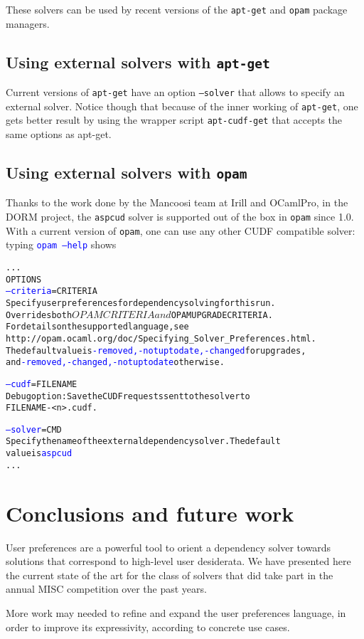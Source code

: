 \documentclass{article}
\begin{document}
These solvers can be used by recent versions of the \texttt{apt-get} and \texttt{opam} package managers.

\subsection{Using external solvers with \texttt{apt-get}}

Current versions of \texttt{apt-get} have an option \texttt{--solver} that allows to specify an external
solver. Notice though that because of the inner working of \texttt{apt-get}, one gets better result
by using the wrapper script \texttt{apt-cudf-get} that accepts the same options as apt-get.

\subsection{Using external solvers with \texttt{opam}}
Thanks to the work done by the Mancoosi team at Irill and OCamlPro, in the DORM project,
the \texttt{aspcud} solver is supported out of the box in \texttt{opam} since 1.0.
With a current version of \texttt{opam}, one can use any other CUDF compatible solver:
typing \textcolor{blue}{\texttt{opam --help}} shows 

\begin{alltt}
...
OPTIONS
  \textcolor{blue}{--criteria}=CRITERIA
      Specify user preferences for dependency solving for this run.
      Overrides both $OPAMCRITERIA and $OPAMUPGRADECRITERIA. 
      For details on the supported language, see
      http://opam.ocaml.org/doc/Specifying_Solver_Preferences.html. 
      The default value is \textcolor{blue}{-removed,-notuptodate,-changed} for upgrades,
      and \textcolor{blue}{-removed,-changed,-notuptodate} otherwise.

  \textcolor{blue}{--cudf}=FILENAME
      Debug option: Save the CUDF requests sent to the solver to
      FILENAME-<n>.cudf.

  \textcolor{blue}{--solver}=CMD
      Specify the name of the external dependency solver. The default
      value is \textcolor{blue}{aspcud}
...
\end{alltt}

\section{Conclusions and future work}
User preferences are a powerful tool to orient a dependency solver towards solutions that correspond
to high-level user desiderata. We have presented here the current state of the art for the class of
solvers that did take part in the annual MISC competition over the past years.

More work may needed to refine and expand the user preferences language, in order to improve its
expressivity, according to concrete use cases.

\nocite{packup-2010, MCCS-2010, aspcud-2011}

%


\end{document}
